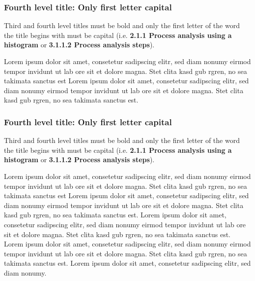 \subsubsection{Fourth level title: Only first letter capital}

Third and fourth level titles must be bold and only the first letter of the word the title begins with must be capital (i.e. \textbf{2.1.1 Process analysis using a histogram} or \textbf{3.1.1.2 Process analysis steps}).

Lorem ipsum dolor sit amet, consetetur sadipscing elitr, sed diam nonumy eirmod tempor invidunt ut lab ore sit et dolore magna. Stet clita kasd gub rgren, no sea takimata sanctus est Lorem ipsum dolor sit amet, consetetur sadipscing elitr, sed diam nonumy eirmod tempor invidunt ut lab ore sit et dolore magna. Stet clita kasd gub rgren, no sea takimata sanctus est.

\subsubsection{Fourth level title: Only first letter capital}

Third and fourth level titles must be bold and only the first letter of the word the title begins with must be capital (i.e. \textbf{2.1.1 Process analysis using a histogram} or \textbf{3.1.1.2 Process analysis steps}).


Lorem ipsum dolor sit amet, consetetur sadipscing elitr, sed diam nonumy eirmod tempor invidunt ut lab ore sit et dolore magna. Stet clita kasd gub rgren, no sea takimata sanctus est Lorem ipsum dolor sit amet, consetetur sadipscing elitr, sed diam nonumy eirmod tempor invidunt ut lab ore sit et dolore magna. Stet clita kasd gub rgren, no sea takimata sanctus est. Lorem ipsum dolor sit amet, consetetur sadipscing elitr, sed diam nonumy eirmod tempor invidunt ut lab ore sit et dolore magna. Stet clita kasd gub rgren, no sea takimata sanctus est. Lorem ipsum dolor sit amet, consetetur sadipscing elitr, sed diam nonumy eirmod tempor invidunt ut lab ore sit et dolore magna. Stet clita kasd gub rgren, no sea takimata sanctus est. Lorem ipsum dolor sit amet, consetetur sadipscing elitr, sed diam nonumy.



